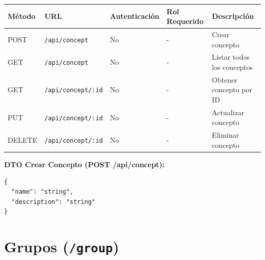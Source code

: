\documentclass[11pt]{article}
\begin{document}
\begin{longtable}{lllll}
\toprule
\textbf{Método} & \textbf{URL} & \textbf{Autenticación} & \textbf{Rol Requerido} & \textbf{Descripción} \\
\midrule
\endhead
POST & \texttt{/api/concept} & No & - & Crear concepto \\
GET & \texttt{/api/concept} & No & - & Listar todos los conceptos \\
GET & \texttt{/api/concept/:id} & No & - & Obtener concepto por ID \\
PUT & \texttt{/api/concept/:id} & No & - & Actualizar concepto \\
DELETE & \texttt{/api/concept/:id} & No & - & Eliminar concepto \\
\bottomrule
\end{longtable}

\textbf{DTO Crear Concepto (POST /api/concept):}
\begin{Verbatim}
{
  "name": "string",
  "description": "string"
}
\end{Verbatim}

\section{Grupos (\texttt{/group})}
\end{document}
